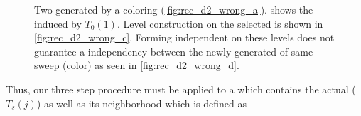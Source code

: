      \begin{figure}[thbp]
     	\centering
     	\hspace{0.6em}
     	\hspace{0.6em}
     	\hspace{0.6em}
     	\caption{Two \levelGroups generated by a \DTWO coloring (\cref{fig:rec_d2_wrong_a}).  shows the \subgraph induced by \levelGroup $T_0(1)$. Level construction on the selected \subgraph is shown in \cref{fig:rec_d2_wrong_c}. Forming \DTWO independent \levelGroups on these levels does not guarantee a \DTWO independency between the newly generated \levelGroups of same sweep (color) as seen in \cref{fig:rec_d2_wrong_d}.}
     	\label{fig:rec_d2_wrong}
     \end{figure}
Thus, our three step procedure must be applied to a \subgraph which contains the actual \levelGroup ($T_s(j)$) as well as its \DKM neighborhood which is defined as 
